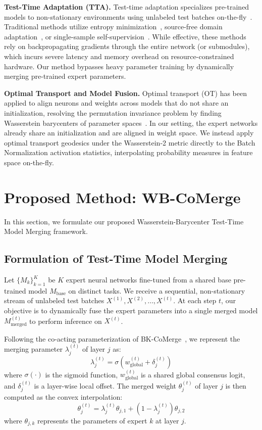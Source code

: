 \documentclass{article}
\theoremstyle{plain}
\theoremstyle{definition}
\theoremstyle{remark}
\begin{document}
\textbf{Test-Time Adaptation (TTA).} Test-time adaptation specializes pre-trained models to non-stationary environments using unlabeled test batches on-the-fly~\cite{wang2020tent,schneider2020improving}. Traditional methods utilize entropy minimization~\cite{wang2020tent}, source-free domain adaptation~\cite{liang2020shot}, or single-sample self-supervision~\cite{zhang2022memo}. While effective, these methods rely on backpropagating gradients through the entire network (or submodules), which incurs severe latency and memory overhead on resource-constrained hardware. Our method bypasses heavy parameter training by dynamically merging pre-trained expert parameters.

\textbf{Optimal Transport and Model Fusion.} Optimal transport (OT) has been applied to align neurons and weights across models that do not share an initialization, resolving the permutation invariance problem by finding Wasserstein barycenters of parameter spaces~\cite{singh2020model,davis2021optimal}. In our setting, the expert networks already share an initialization and are aligned in weight space. We instead apply optimal transport geodesics under the Wasserstein-2 metric directly to the Batch Normalization activation statistics, interpolating probability measures in feature space on-the-fly.

\section{Proposed Method: WB-CoMerge}
\label{sec:method}

In this section, we formulate our proposed Wasserstein-Barycenter Test-Time Model Merging framework.

\subsection{Formulation of Test-Time Model Merging}
Let $\{M_k\}_{k=1}^K$ be $K$ expert neural networks fine-tuned from a shared base pre-trained model $M_{\text{base}}$ on distinct tasks. We receive a sequential, non-stationary stream of unlabeled test batches $X^{(1)}, X^{(2)}, \dots, X^{(t)}$. At each step $t$, our objective is to dynamically fuse the expert parameters into a single merged model $M_{\text{merged}}^{(t)}$ to perform inference on $X^{(t)}$.

Following the co-acting parameterization of BK-CoMerge~\cite{anonymous}, we represent the merging parameter $\lambda_j^{(t)}$ of layer $j$ as:
\begin{equation}
  \lambda_j^{(t)} = \sigma(w_{\text{global}}^{(t)} + \delta_j^{(t)})
\end{equation}
where $\sigma(\cdot)$ is the sigmoid function, $w_{\text{global}}^{(t)}$ is a shared global consensus logit, and $\delta_j^{(t)}$ is a layer-wise local offset. The merged weight $\theta_j^{(t)}$ of layer $j$ is then computed as the convex interpolation:
\begin{equation}
  \theta_j^{(t)} = \lambda_j^{(t)} \theta_{j, 1} + (1 - \lambda_j^{(t)}) \theta_{j, 2}
\end{equation}
where $\theta_{j, k}$ represents the parameters of expert $k$ at layer $j$.
\end{document}
